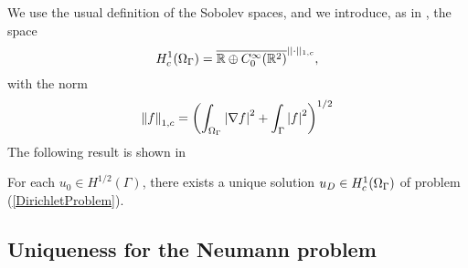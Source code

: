 \documentclass[10pt,a4paper]{article}
\begin{document}
We use the usual definition of the Sobolev spaces, and we introduce, as in \cite{stephan1984augmented}, the space
\begin{equation}
	H^{1}_c(\Omega_\Gamma) = \overline{\mathbb{R}\oplus C^{\infty}_0(\mathbb{R}^2)}^{||\cdot||_{1,c}},
\end{equation}
with the norm 
\newcommand{\Hc}{H^{1}_c(\Omegam)}
\begin{equation}
	\left\|f\right\|_{1,c} = \left(\int_{\Omega_\Gamma} \left\lvert \nabla f \right\rvert^2 + \int_{\Gamma} \left\lvert f \right\rvert^2\right)^{1/2}
\end{equation}
The following result is shown in \cite{stephan1984augmented}
\begin{The}
	For each $u_0 \in H^{1/2}(\Gamma)$, there exists a unique solution $u_D \in \Hc$ of problem (\ref{DirichletProblem}). 
\end{The}

\subsection*{Uniqueness for the Neumann problem}
\end{document}
